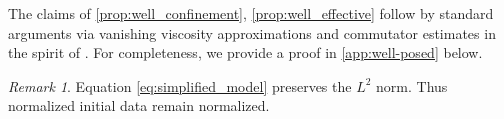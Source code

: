 \documentclass[a4paper,10pt]{amsart}
\newcommand{\R}{\mathbb{R}}
\newtheorem{proposition}[theorem]{Proposition}
\theoremstyle{remark}
\newtheorem{remark}[theorem]{Remark}
\numberwithin{equation}{section}
\begin{document}
The claims of \cref{prop:well_confinement}, \cref{prop:well_effective} follow by standard arguments via vanishing viscosity approximations and commutator estimates in the spirit of \cite{diperna1989ordinary}. For completeness, we provide a proof in \autoref{app:well-posed} below.


\begin{remark}
Equation \eqref{eq:simplified_model} preserves the $L^2$ norm. Thus normalized
initial data remain normalized. 
\end{remark}
\end{document}
